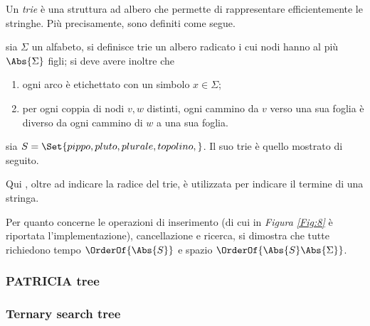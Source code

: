 \documentclass{subfiles}
\begin{document}
Un \emph{trie} è una struttura ad albero che permette di rappresentare efficientemente le stringhe.
Più precisamente, sono definiti come segue.

\begin{Definition*}
    sia \(\Sigma\) un alfabeto, si definisce trie un albero radicato i cui nodi hanno al più \(\Abs{\Sigma}\) figli;
    si deve avere inoltre che
    \begin{enumerate}
        \item ogni arco è etichettato con un simbolo \(x \in \Sigma\);
        \item per ogni coppia di nodi \(v, w\) distinti, ogni cammino da \(v\) verso una sua foglia è diverso da ogni cammino di \(w\) a una sua foglia.
    \end{enumerate}
\end{Definition*}

\begin{Example*}
    sia \(S = \Set{pippo, pluto, plurale, topolino,}\). Il suo trie è quello mostrato di seguito.
    

    \begin{Remark*}
        Qui , oltre ad indicare la radice del trie,
        è utilizzata per indicare il termine di una stringa.
    \end{Remark*}
\end{Example*}

Per quanto concerne le operazioni di inserimento (di cui in \emph{Figura \ref{Fig:8}} è riportata l'implementazione), cancellazione e ricerca,
si dimostra che tutte richiedono tempo \(\OrderOf{\Abs{S}}\) e spazio \(\OrderOf{\Abs{S}\Abs{\Sigma}}\).


\subsubsection{PATRICIA tree}


\subsubsection{Ternary search tree}

\end{document}
